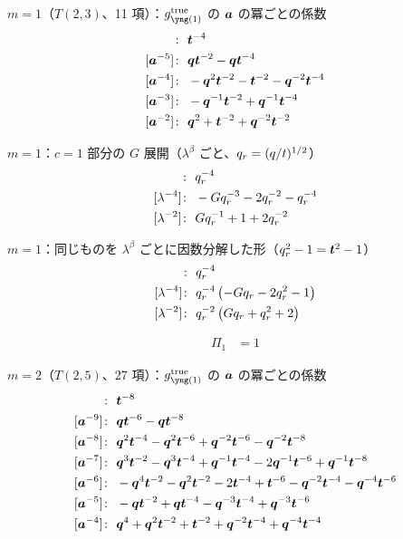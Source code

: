 $m = 1$（$T(2,3)$、11 項）：$g^{\mathrm{true}}_{\yone}$ の $\bm{a}$ の冪ごとの係数
\begin{align*}
[\ba^{-6}]\colon\ & \bt^{-4} \\
[\ba^{-5}]\colon\ & \bq \bt^{-2} -\bq \bt^{-4} \\
[\ba^{-4}]\colon\ & -\bq^{2} \bt^{-2} -\bt^{-2} -\bq^{-2} \bt^{-4} \\
[\ba^{-3}]\colon\ & -\bq^{-1} \bt^{-2} +\bq^{-1} \bt^{-4} \\
[\ba^{-2}]\colon\ & \bq^{2} +\bt^{-2} +\bq^{-2} \bt^{-2}
\end{align*}

$m = 1$：$c = 1$ 部分の $G$ 展開（$\lambda^\beta$ ごと、$q_r = (q/t)^{1/2}$）
\begin{align*}
[\lambda^{-6}]\colon\ & \qr^{-4} \\
[\lambda^{-4}]\colon\ & -G \qr^{-3} -2 \qr^{-2} -\qr^{-4} \\
[\lambda^{-2}]\colon\ & G \qr^{-1} +1 +2 \qr^{-2}
\end{align*}

$m = 1$：同じものを $\lambda^\beta$ ごとに因数分解した形（$q_r^2 - 1 = \bm{t}^2 - 1$）
\begin{align*}
[\lambda^{-6}]\colon\ & \qr^{-4} \\
[\lambda^{-4}]\colon\ & \qr^{-4}\,\bigl(- G \qr - 2 \qr^{2} - 1\bigr) \\
[\lambda^{-2}]\colon\ & \qr^{-2}\,\bigl(G \qr + \qr^{2} + 2\bigr)
\end{align*}

\begin{align*}
\Pi_{1} &= 1
\end{align*}

$m = 2$（$T(2,5)$、27 項）：$g^{\mathrm{true}}_{\yone}$ の $\bm{a}$ の冪ごとの係数
\begin{align*}
[\ba^{-10}]\colon\ & \bt^{-8} \\
[\ba^{-9}]\colon\ & \bq \bt^{-6} -\bq \bt^{-8} \\
[\ba^{-8}]\colon\ & \bq^{2} \bt^{-4} -\bq^{2} \bt^{-6} +\bq^{-2} \bt^{-6} -\bq^{-2} \bt^{-8} \\
[\ba^{-7}]\colon\ & \bq^{3} \bt^{-2} -\bq^{3} \bt^{-4} +\bq^{-1} \bt^{-4} -2 \bq^{-1} \bt^{-6} +\bq^{-1} \bt^{-8} \\
[\ba^{-6}]\colon\ & -\bq^{4} \bt^{-2} -\bq^{2} \bt^{-2} -2 \bt^{-4} +\bt^{-6} -\bq^{-2} \bt^{-4} -\bq^{-4} \bt^{-6} \\
[\ba^{-5}]\colon\ & -\bq \bt^{-2} +\bq \bt^{-4} -\bq^{-3} \bt^{-4} +\bq^{-3} \bt^{-6} \\
[\ba^{-4}]\colon\ & \bq^{4} +\bq^{2} \bt^{-2} +\bt^{-2} +\bq^{-2} \bt^{-4} +\bq^{-4} \bt^{-4}
\end{align*}

